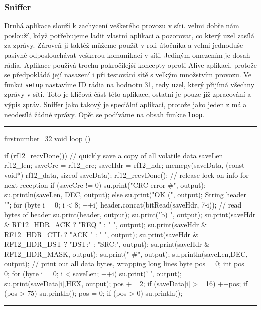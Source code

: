\documentclass[12pt,titlepage]{article}
\newcommand{\codetitle}[1]{\bigskip \noindent {\scriptsize #1}\hrule}
\begin{document}
		\subsubsection{Sniffer}
		Druhá aplikace slouží k zachycení veškerého provozu v síti. velmi dobře nám poslouží, když potřebujeme ladit vlastní aplikaci a pozorovat, co který uzel zasílá za zprávy. Zároveň ji taktéž můžeme použít v roli útočníka a velmi jednoduše pasivně odposlouchávat veškerou komunikaci v síti. Jediným omezením je dosah rádia. Aplikace používá trochu pokročilejší koncepty oproti Alive aplikaci, protože se předpokládá její nasazení i při testování sítě s velkým množstvím provozu. Ve funkci \texttt{setup} nastavíme ID rádia na hodnotu 31, tedy uzel, který přijímá všechny zprávy v síti. Toto je klíčová část této aplikace, ostatní je pouze již zpracování a výpis zpráv. Sniffer jako takový je speciální aplikací, protože jako jeden z mála neodesílá žádné zprávy. Opět se podíváme na obsah funkce \texttt{loop}.
\newpage
\codetitle{Funkce \texttt{loop} v aplikaci Sniffer}
\begin{cppcode*}{firstnumber=32}  
void loop () {

    if (rf12_recvDone()) {
        // quickly save a copy of all volatile data saveLen = rf12_len;
        saveCrc = rf12_crc;
        saveHdr = rf12_hdr;
        memcpy(saveData, (const void*) rf12_data, sizeof saveData);
        rf12_recvDone();
        // release lock on info for next reception
        if (saveCrc != 0) {
            su.print("CRC error #", output);
            su.println(saveLen, DEC, output);
        }
        else {
            su.print("OK (", output);
            String header = "";
            for (byte i = 0; i < 8; ++i) {
                header.concat(bitRead(saveHdr, 7-i)); // read bytes of header 
            }
            su.print(header, output);
            su.print("b) ", output);
            su.print(saveHdr & RF12_HDR_ACK ? "REQ " : " ", output);
            su.print(saveHdr & RF12_HDR_CTL ? "ACK " : " ", output);
            su.print(saveHdr & RF12_HDR_DST ? "DST:" : "SRC:", output);
            su.print(saveHdr & RF12_HDR_MASK, output);
            su.print(" #", output);
            su.println(saveLen,DEC, output);
            // print out all data bytes, wrapping long lines byte pos = 0;
            int pos = 0;
            for (byte i = 0; i < saveLen; ++i) {
                su.print(' ', output);
                su.print(saveData[i],HEX, output);
                pos += 2;
                if (saveData[i] >= 16) ++pos;
                if (pos > 75) {
                    su.println();
                    pos = 0;
                }
            }
            if (pos > 0) su.println();
        }
    }
}
\end{cppcode*}
\hrule
\bigskip 
\end{document}
